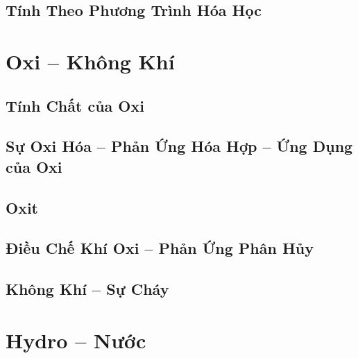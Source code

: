 \documentclass{article}
\numberwithin{equation}{section}
\begin{document}

\subsection{Tính Theo Phương Trình Hóa Học}


\section{Oxi -- Không Khí}

\subsection{Tính Chất của Oxi}


\subsection{Sự Oxi Hóa -- Phản Ứng Hóa Hợp -- Ứng Dụng của Oxi}


\subsection{Oxit}


\subsection{Điều Chế Khí Oxi -- Phản Ứng Phân Hủy}


\subsection{Không Khí -- Sự Cháy}


\section{Hydro -- Nước}
\end{document}
